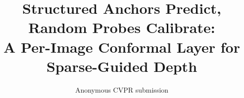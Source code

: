 \documentclass[10pt,twocolumn,letterpaper]{article}
\title{Structured Anchors Predict, Random Probes Calibrate:\\A Per-Image Conformal Layer for Sparse-Guided Depth}
\author{Anonymous CVPR submission}
\begin{document}
\maketitle










{
    \small
    
    
}
\end{document}
